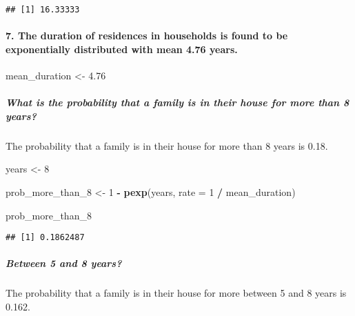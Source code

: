 \documentclass[
]{article}
\newenvironment{Shaded}{\begin{snugshade}}{\end{snugshade}}
\newcommand{\AttributeTok}[1]{\textcolor[rgb]{0.13,0.29,0.53}{#1}}
\newcommand{\DecValTok}[1]{\textcolor[rgb]{0.00,0.00,0.81}{#1}}
\newcommand{\FloatTok}[1]{\textcolor[rgb]{0.00,0.00,0.81}{#1}}
\newcommand{\FunctionTok}[1]{\textcolor[rgb]{0.13,0.29,0.53}{\textbf{#1}}}
\newcommand{\NormalTok}[1]{#1}
\newcommand{\OtherTok}[1]{\textcolor[rgb]{0.56,0.35,0.01}{#1}}
\newcommand{\SpecialCharTok}[1]{\textcolor[rgb]{0.81,0.36,0.00}{\textbf{#1}}}
\begin{document}
\begin{verbatim}
## [1] 16.33333
\end{verbatim}

\hypertarget{the-duration-of-residences-in-households-is-found-to-be-exponentially-distributed-with-mean-4.76-years.}{%
\paragraph{7. The duration of residences in households is found to be
exponentially distributed with mean 4.76
years.}\label{the-duration-of-residences-in-households-is-found-to-be-exponentially-distributed-with-mean-4.76-years.}}

\begin{Shaded}
\begin{Highlighting}[]
\NormalTok{mean\_duration }\OtherTok{\textless{}{-}} \FloatTok{4.76}
\end{Highlighting}
\end{Shaded}

\hypertarget{what-is-the-probability-that-a-family-is-in-their-house-for-more-than-8-years}{%
\subparagraph{What is the probability that a family is in their house
for more than 8
years?}\label{what-is-the-probability-that-a-family-is-in-their-house-for-more-than-8-years}}

The probability that a family is in their house for more than 8 years is
0.18.

\begin{Shaded}
\begin{Highlighting}[]
\NormalTok{years }\OtherTok{\textless{}{-}} \DecValTok{8}

\NormalTok{prob\_more\_than\_8 }\OtherTok{\textless{}{-}} \DecValTok{1} \SpecialCharTok{{-}} \FunctionTok{pexp}\NormalTok{(years, }\AttributeTok{rate =} \DecValTok{1} \SpecialCharTok{/}\NormalTok{ mean\_duration)}

\NormalTok{prob\_more\_than\_8}
\end{Highlighting}
\end{Shaded}

\begin{verbatim}
## [1] 0.1862487
\end{verbatim}

\hypertarget{between-5-and-8-years}{%
\subparagraph{Between 5 and 8 years?}\label{between-5-and-8-years}}

The probability that a family is in their house for more between 5 and 8
years is 0.162.
\end{document}
